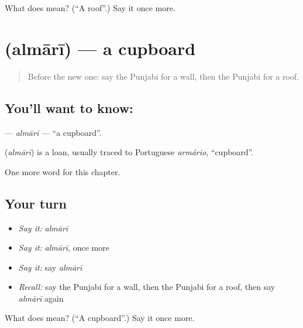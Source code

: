 \begin{tcolorbox}[breakable,colback=teal!4,colframe=teal!35!black,title={Before you move on}]
What does  mean? (\textquotedblleft{}A roof\textquotedblright{}.) Say it once more.
\end{tcolorbox}
\section[\texorpdfstring{\pa{ਅਲਮਾਰੀ} (almārī)}{ਅਲਮਾਰੀ (almārī)}]{ (almārī) — a cupboard}

\label{lesson:PA-C68-almari}



\begin{quote}
Before the new one: say the Punjabi for a wall, then the Punjabi for a roof.
\end{quote}

\subsection*{You'll want to know: }
\textbf{} — \emph{almārī} — \textquotedblleft{}a cupboard\textquotedblright{}.

\begin{cousinweb}
\textbf{} (\emph{almārī}) is a loan, usually traced to Portuguese \emph{armário}, \textquotedblleft{}cupboard\textquotedblright{}.
\end{cousinweb}

\begin{grammarlens}[title={What you've built}]
One more word for this chapter.
\end{grammarlens}

\subsection*{Your turn}
\begin{itemize}
\raggedright
  \item \emph{Say it:} \emph{almārī}
  \item \emph{Say it:} \emph{almārī}, once more
  \item \emph{Say it:} say \emph{almārī}
  \item \emph{Recall:} say the Punjabi for a wall, then the Punjabi for a roof, then say \emph{almārī} again
\end{itemize}

\begin{tcolorbox}[breakable,colback=teal!4,colframe=teal!35!black,title={Before you move on}]
What does  mean? (\textquotedblleft{}A cupboard\textquotedblright{}.) Say it once more.
\end{tcolorbox}
